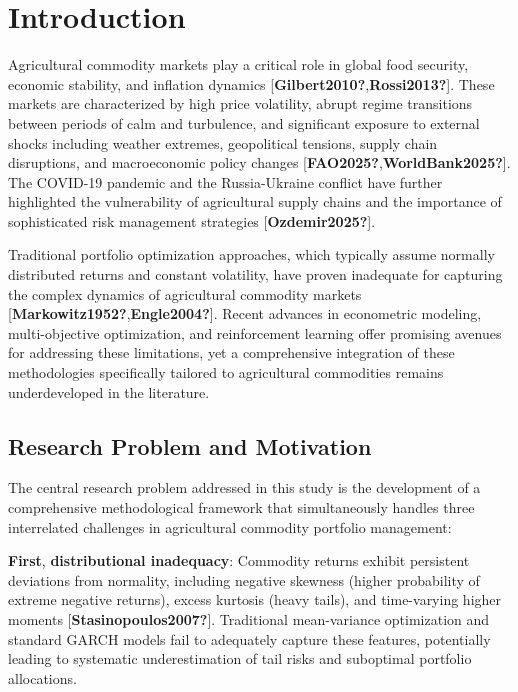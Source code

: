 \documentclass[
  10pt,
  a4paper,
]{article}
\begin{document}
\section{Introduction}\label{sec-introduction}

Agricultural commodity markets play a critical role in global food
security, economic stability, and inflation dynamics
{[}\textbf{Gilbert2010?},\textbf{Rossi2013?}{]}. These markets are
characterized by high price volatility, abrupt regime transitions
between periods of calm and turbulence, and significant exposure to
external shocks including weather extremes, geopolitical tensions,
supply chain disruptions, and macroeconomic policy changes
{[}\textbf{FAO2025?},\textbf{WorldBank2025?}{]}. The COVID-19 pandemic
and the Russia-Ukraine conflict have further highlighted the
vulnerability of agricultural supply chains and the importance of
sophisticated risk management strategies {[}\textbf{Ozdemir2025?}{]}.

Traditional portfolio optimization approaches, which typically assume
normally distributed returns and constant volatility, have proven
inadequate for capturing the complex dynamics of agricultural commodity
markets {[}\textbf{Markowitz1952?},\textbf{Engle2004?}{]}. Recent
advances in econometric modeling, multi-objective optimization, and
reinforcement learning offer promising avenues for addressing these
limitations, yet a comprehensive integration of these methodologies
specifically tailored to agricultural commodities remains underdeveloped
in the literature.

\subsection{Research Problem and Motivation}\label{sec-problem}

The central research problem addressed in this study is the development
of a comprehensive methodological framework that simultaneously handles
three interrelated challenges in agricultural commodity portfolio
management:

\textbf{First}, \textbf{distributional inadequacy}: Commodity returns
exhibit persistent deviations from normality, including negative
skewness (higher probability of extreme negative returns), excess
kurtosis (heavy tails), and time-varying higher moments
{[}\textbf{Stasinopoulos2007?}{]}. Traditional mean-variance
optimization and standard GARCH models fail to adequately capture these
features, potentially leading to systematic underestimation of tail
risks and suboptimal portfolio allocations.
\end{document}
